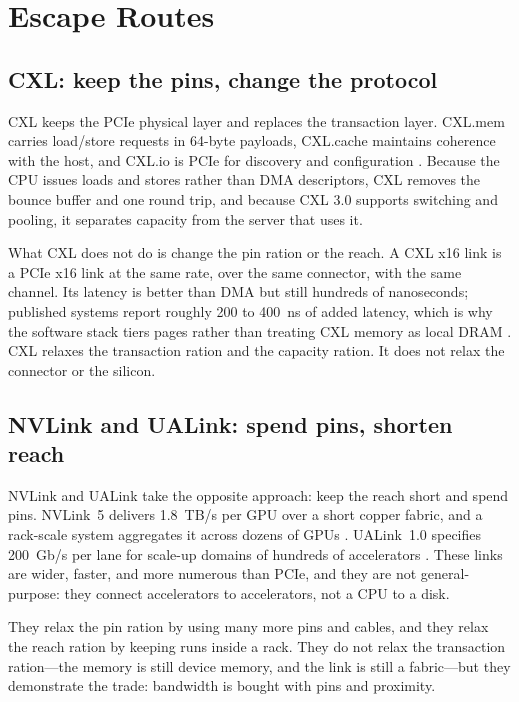\documentclass[10pt,letterpaper]{article}
\begin{document}
\section{Escape Routes}
\label{sec:escape}

\subsection{CXL: keep the pins, change the protocol}

CXL keeps the PCIe physical layer and replaces the transaction layer. CXL.mem carries load/store requests in 64-byte payloads, CXL.cache maintains coherence with the host, and CXL.io is PCIe for discovery and configuration \cite{cxl30,cxl31}. Because the CPU issues loads and stores rather than DMA descriptors, CXL removes the bounce buffer and one round trip, and because CXL 3.0 supports switching and pooling, it separates capacity from the server that uses it.

What CXL does not do is change the pin ration or the reach. A CXL x16 link is a PCIe x16 link at the same rate, over the same connector, with the same channel. Its latency is better than DMA but still hundreds of nanoseconds; published systems report roughly 200 to 400~ns of added latency, which is why the software stack tiers pages rather than treating CXL memory as local DRAM \cite{tpp,pond,directcxl,demystify}. CXL relaxes the transaction ration and the capacity ration. It does not relax the connector or the silicon.

\subsection{NVLink and UALink: spend pins, shorten reach}

NVLink and UALink take the opposite approach: keep the reach short and spend pins. NVLink~5 delivers 1.8~TB/s per GPU over a short copper fabric, and a rack-scale system aggregates it across dozens of GPUs \cite{nvl72,h100}. UALink~1.0 specifies 200~Gb/s per lane for scale-up domains of hundreds of accelerators \cite{ualink}. These links are wider, faster, and more numerous than PCIe, and they are not general-purpose: they connect accelerators to accelerators, not a CPU to a disk.

They relax the pin ration by using many more pins and cables, and they relax the reach ration by keeping runs inside a rack. They do not relax the transaction ration---the memory is still device memory, and the link is still a fabric---but they demonstrate the trade: bandwidth is bought with pins and proximity.
\end{document}
